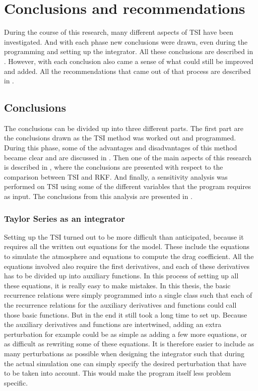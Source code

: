 \chapter{Conclusions and recommendations} 
\label{ch:conclusionsandrecommendations}
During the course of this research, many different aspects of \ac{TSI} have been investigated. And with each phase new conclusions were drawn, even during the programming and setting up the integrator. All these conclusions are described in . However, with each conclusion also came a sense of what could still be improved and added. All the recommendations that came out of that process are described in .


\section{Conclusions}
\label{sec:conclusions}
The conclusions can be divided up into three different parts. The first part are the conclusions drawn as the \ac{TSI} method was worked out and programmed. During this phase, some of the advantages and disadvantages of this method became clear and are discussed in . Then one of the main aspects of this research is described in , where the conclusions are presented with respect to the comparison between \ac{TSI} and \ac{RKF}. And finally, a sensitivity analysis was performed on \ac{TSI} using some of the different variables that the program requires as input. The conclusions from this analysis are presented in .

\subsection{Taylor Series as an integrator}
\label{subsec:taylorSeriesAsAnIntegrator}
Setting up the \ac{TSI} turned out to be more difficult than anticipated, because it requires all the written out equations for the model. These include the equations to simulate the atmosphere and equations to compute the drag coefficient. All the equations involved also require the first derivatives, and each of these derivatives has to be divided up into auxiliary functions. In this process of setting up all these equations, it is really easy to make mistakes. In this thesis, the basic recurrence relations were simply programmed into a single class such that each of the recurrence relations for the auxiliary derivatives and functions could call those basic functions. But in the end it still took a long time to set up. Because the auxiliary derivatives and functions are intertwined, adding an extra perturbation for example could be as simple as adding a few more equations, or as difficult as rewriting some of these equations. It is therefore easier to include as many perturbations as possible when designing the integrator such that during the actual simulation one can simply specify the desired perturbation that have to be taken into account. This would make the program itself less problem specific. \\

